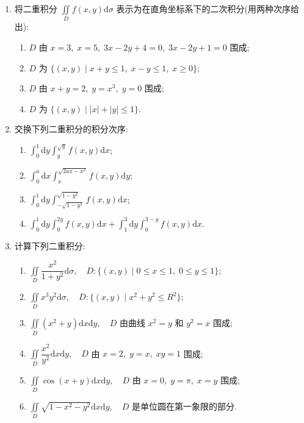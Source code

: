 \begin{enumerate}\setlength{\itemsep}{7pt}
    \item 将二重积分 $\displaystyle \iint\limits_{D}f(x, y)\text{d}\sigma$ 表示为在直角坐标系下的二次积分(用两种次序给出):
    \begin{enumerate}[(1)]\setlength{\itemsep}{5pt}\setlength{\topsep}{15pt}
        \item $D$ 由 $x=3,\;x=5,\;3x-2y+4=0,\;3x-2y+1=0$ 围成;
        \item $D$ 为 $\{(x, y)\mid x+y\leqslant 1,\;x-y\leqslant 1,\;x\geqslant 0\}$;
        \item $D$ 由 $x+y=2,\;y=x^3,\;y=0$ 围成;
        \item $D$ 为 $\{(x, y)\mid |x|+|y|\leqslant 1\}$.    
    \end{enumerate}

    \item 交换下列二重积分的积分次序:
    \begin{enumerate}[(1)]\setlength{\itemsep}{5pt}\setlength{\topsep}{15pt}
        \item $\displaystyle \int_0^1\text{d}y\int_{y}^{\sqrt{y}}f(x, y)\text{d}x$;
        \item $\displaystyle \int_0^a\text{d}x\int_{x}^{\sqrt{2ax-x^2}}f(x, y)\text{d}y$;
        \item $\displaystyle \int_0^1\text{d}y\int_{-\sqrt{1-y^2}}^{\sqrt{1-y^2}}f(x, y)\text{d}x$;
        \item $\displaystyle \int_0^1\text{d}y\int_0^{2y}f(x, y)\text{d}x+\int_1^3\text{d}y\int_0^{3-y}f(x, y)\text{d}x$.
    \end{enumerate}

    \item 计算下列二重积分:
    \begin{enumerate}[(1)]\setlength{\itemsep}{5pt}\setlength{\topsep}{15pt}
        \item $\displaystyle \iint\limits_{D}\dfrac{x^2}{1+y^2}\text{d}\sigma,\quad D : \{(x, y)\mid 0\leqslant x\leqslant 1,\;0\leqslant y\leqslant 1\}$;
        \item $\displaystyle \iint\limits_{D}x^3y^2\text{d}\sigma,\quad D : \{(x, y)\mid x^2+y^2\leqslant R^2\}$;
        \item $\displaystyle \iint\limits_{D}(x^2+y)\text{d}x\text{d}y,\quad D$ 由曲线 $x^2=y$ 和 $y^2=x$ 围成;
        \item $\displaystyle \iint\limits_{D}\dfrac{x^2}{y^2}\text{d}x\text{d}y,\quad D$ 由 $x=2,\;y=x,\;xy=1$ 围成;
        \item $\displaystyle \iint\limits_{D}\cos(x+y)\text{d}x\text{d}y,\quad D$ 由 $x=0,\;y=\pi,\;x=y$ 围成;
        \item $\displaystyle \iint\limits_{D}\sqrt{1-x^2-y^2}\text{d}x\text{d}y,\quad D$ 是单位圆在第一象限的部分.  
    \end{enumerate}
\end{enumerate}


